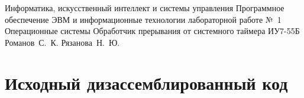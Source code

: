 \documentclass[a4paper,12pt]{bmstu}
\begin{document}
\makereporttitle
    {Информатика, искусственный интеллект и системы управления} %
    {Программное обеспечение ЭВМ и информационные технологии} %
    {лабораторной работе №~1} %
    {Операционные системы} %
    {Обработчик прерывания от системного таймера} %
    {} %
    {ИУ7-55Б} %
    {Романов~С.~К.} %
    {Рязанова~Н.~Ю.} %
\clearpage

\tableofcontents

\chapter{Исходный дизассемблированный код}\label{ch:source}
\end{document}

